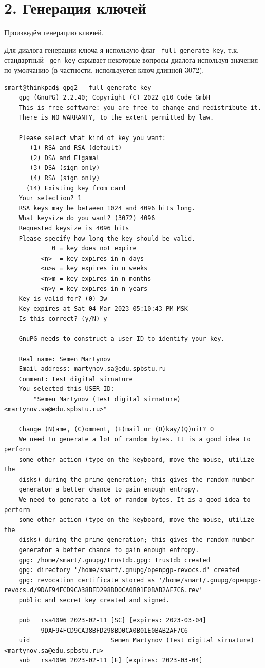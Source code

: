 \section*{2. Генерация ключей}
Произведём генерацию ключей.

Для диалога генерации ключа я использую флаг \texttt{--full-generate-key}, т.к. стандартный \texttt{--gen-key} скрывает некоторые вопросы диалога используя значения по умолчанию (в частности, используется ключ длинной 3072).
\begin{Verbatim}[frame=single]
    smart@thinkpad$ gpg2 --full-generate-key
    gpg (GnuPG) 2.2.40; Copyright (C) 2022 g10 Code GmbH
    This is free software: you are free to change and redistribute it.
    There is NO WARRANTY, to the extent permitted by law.
    
    Please select what kind of key you want:
       (1) RSA and RSA (default)
       (2) DSA and Elgamal
       (3) DSA (sign only)
       (4) RSA (sign only)
      (14) Existing key from card
    Your selection? 1
    RSA keys may be between 1024 and 4096 bits long.
    What keysize do you want? (3072) 4096
    Requested keysize is 4096 bits
    Please specify how long the key should be valid.
             0 = key does not expire
          <n>  = key expires in n days
          <n>w = key expires in n weeks
          <n>m = key expires in n months
          <n>y = key expires in n years
    Key is valid for? (0) 3w
    Key expires at Sat 04 Mar 2023 05:10:43 PM MSK
    Is this correct? (y/N) y
    
    GnuPG needs to construct a user ID to identify your key.
    
    Real name: Semen Martynov
    Email address: martynov.sa@edu.spbstu.ru
    Comment: Test digital sirnature
    You selected this USER-ID:
        "Semen Martynov (Test digital sirnature) <martynov.sa@edu.spbstu.ru>"
    
    Change (N)ame, (C)omment, (E)mail or (O)kay/(Q)uit? O
    We need to generate a lot of random bytes. It is a good idea to perform
    some other action (type on the keyboard, move the mouse, utilize the
    disks) during the prime generation; this gives the random number
    generator a better chance to gain enough entropy.
    We need to generate a lot of random bytes. It is a good idea to perform
    some other action (type on the keyboard, move the mouse, utilize the
    disks) during the prime generation; this gives the random number
    generator a better chance to gain enough entropy.
    gpg: /home/smart/.gnupg/trustdb.gpg: trustdb created
    gpg: directory '/home/smart/.gnupg/openpgp-revocs.d' created
    gpg: revocation certificate stored as '/home/smart/.gnupg/openpgp-revocs.d/9DAF94FCD9CA38BFD298BD0CA0B01E0BAB2AF7C6.rev'
    public and secret key created and signed.
    
    pub   rsa4096 2023-02-11 [SC] [expires: 2023-03-04]
          9DAF94FCD9CA38BFD298BD0CA0B01E0BAB2AF7C6
    uid                      Semen Martynov (Test digital sirnature) <martynov.sa@edu.spbstu.ru>
    sub   rsa4096 2023-02-11 [E] [expires: 2023-03-04]
\end{Verbatim}

